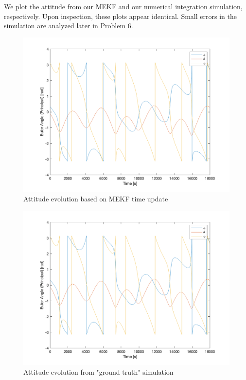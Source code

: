 We plot the attitude from our MEKF and our numerical integration simulation, respectively. Upon inspection, these plots appear identical. Small errors in the simulation are analyzed later in Problem 6.

\begin{figure}[H]
\centering
\includegraphics[scale=0.6]{Images/ps7_problem5a_angle_est.png}
\caption{Attitude evolution based on MEKF time update}
\label{fig:ps7_problem5a_angle_est}
\end{figure}

\begin{figure}[H]
\centering
\includegraphics[scale=0.6]{Images/ps7_problem5a_angle_sim.png}
\caption{Attitude evolution from "ground truth" simulation}
\label{fig:ps7_problem5a_angle_sim}
\end{figure}

